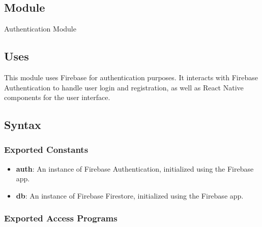 \documentclass[12pt, titlepage]{article}
\begin{document}
\subsection{Module}

Authentication Module

\subsection{Uses}
This module uses Firebase for authentication purposes. It interacts with
Firebase Authentication to handle user login and registration, as well as React
Native components for the user interface.

\subsection{Syntax}

\subsubsection{Exported Constants}

\begin{itemize}
    \item \textbf{auth}: An instance of Firebase Authentication, initialized using the Firebase app.
    \item \textbf{db}: An instance of Firebase Firestore, initialized using the Firebase app.
\end{itemize}

\subsubsection{Exported Access Programs}
\end{document}
